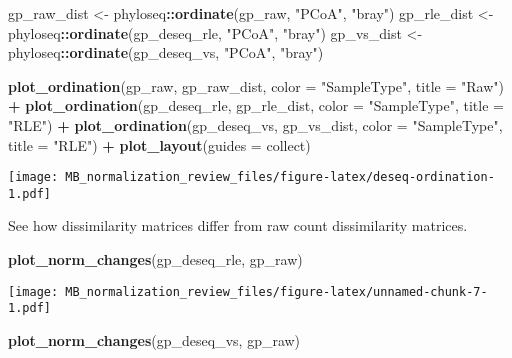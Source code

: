 \documentclass[
]{book}
\newenvironment{Shaded}{\begin{snugshade}}{\end{snugshade}}
\newcommand{\DataTypeTok}[1]{\textcolor[rgb]{0.13,0.29,0.53}{#1}}
\newcommand{\KeywordTok}[1]{\textcolor[rgb]{0.13,0.29,0.53}{\textbf{#1}}}
\newcommand{\NormalTok}[1]{#1}
\newcommand{\OperatorTok}[1]{\textcolor[rgb]{0.81,0.36,0.00}{\textbf{#1}}}
\newcommand{\StringTok}[1]{\textcolor[rgb]{0.31,0.60,0.02}{#1}}
\begin{document}
\begin{Shaded}
\begin{Highlighting}[]
\NormalTok{gp\_raw\_dist \textless{}{-}}\StringTok{ }\NormalTok{phyloseq}\OperatorTok{::}\KeywordTok{ordinate}\NormalTok{(gp\_raw, }\StringTok{"PCoA"}\NormalTok{, }\StringTok{"bray"}\NormalTok{) }
\NormalTok{gp\_rle\_dist \textless{}{-}}\StringTok{ }\NormalTok{phyloseq}\OperatorTok{::}\KeywordTok{ordinate}\NormalTok{(gp\_deseq\_rle, }\StringTok{"PCoA"}\NormalTok{, }\StringTok{"bray"}\NormalTok{) }
\NormalTok{gp\_vs\_dist \textless{}{-}}\StringTok{ }\NormalTok{phyloseq}\OperatorTok{::}\KeywordTok{ordinate}\NormalTok{(gp\_deseq\_vs, }\StringTok{"PCoA"}\NormalTok{, }\StringTok{"bray"}\NormalTok{) }

\KeywordTok{plot\_ordination}\NormalTok{(gp\_raw, gp\_raw\_dist, }\DataTypeTok{color =} \StringTok{"SampleType"}\NormalTok{, }\DataTypeTok{title =} \StringTok{"Raw"}\NormalTok{) }\OperatorTok{+}\StringTok{ }
\KeywordTok{plot\_ordination}\NormalTok{(gp\_deseq\_rle, gp\_rle\_dist, }\DataTypeTok{color =} \StringTok{"SampleType"}\NormalTok{, }\DataTypeTok{title =} \StringTok{"RLE"}\NormalTok{) }\OperatorTok{+}
\KeywordTok{plot\_ordination}\NormalTok{(gp\_deseq\_vs, gp\_vs\_dist, }\DataTypeTok{color =} \StringTok{"SampleType"}\NormalTok{, }\DataTypeTok{title =} \StringTok{"RLE"}\NormalTok{) }\OperatorTok{+}\StringTok{ }
\StringTok{  }\KeywordTok{plot\_layout}\NormalTok{(}\DataTypeTok{guides =} \StringTok{\textquotesingle{}collect\textquotesingle{}}\NormalTok{)}
\end{Highlighting}
\end{Shaded}

\texttt{[image: MB\_normalization\_review\_files/figure-latex/deseq-ordination-1.pdf]}

See how dissimilarity matrices differ from raw count dissimilarity matrices.

\begin{Shaded}
\begin{Highlighting}[]
\KeywordTok{plot\_norm\_changes}\NormalTok{(gp\_deseq\_rle, gp\_raw)}
\end{Highlighting}
\end{Shaded}

\texttt{[image: MB\_normalization\_review\_files/figure-latex/unnamed-chunk-7-1.pdf]}

\begin{Shaded}
\begin{Highlighting}[]
\KeywordTok{plot\_norm\_changes}\NormalTok{(gp\_deseq\_vs, gp\_raw)}
\end{Highlighting}
\end{Shaded}
\end{document}
